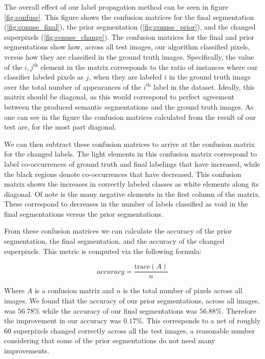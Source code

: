 \documentclass{article} %
\begin{document}
The overall effect of our label propagation method can be seen in figure \ref{fig:confuse}. This figure shows the confusion matrices for the final segmentation (\ref{fig:conuse_final}), the prior segmentation (\ref{fig:conuse_prior}), and the changed superpixels (\ref{fig:conuse_change}). The confusion matrices for the final and prior segmentations show how, across all test images, our algorithm classified pixels, versus how they are classified in the ground truth images. Specifically, the value  of the $i,j^\textrm{th}$ element in the matrix corresponds to the ratio of instances where our classifier labeled pixels as $j$, when they are labeled $i$ in the ground truth image over the total number of appearances of the $i^\textrm{th}$ label in the dataset. Ideally, this matrix should be diagonal, as this would correspond to perfect agreement between the produced semantic segmentations and the ground truth images. As one can see in the figure the confusion matrices calculated from the result of our test are, for the most part diagonal. 

We can then subtract these confusion matrices to arrive at the confusion matrix for the changed labels. The light elements in this confusion matrix correspond to label co-occurrences of ground truth and final labelings that have increased, while the black regions denote co-occurrences that have decreased. This confusion matrix shows the increases in correctly labeled classes as white elements along its diagonal. Of note is the many negative elements in the first column of the matrix. These correspond to decreases in the number of labels classified as void in the final segmentations versus the prior segmentations.

From these confusion matrices we can calculate the accuracy of the prior segmentation, the final segmentation, and the accuracy of the changed superpixels. This metric is computed via the following formula:

\begin{equation}
	accuracy = \frac{\mathrm{trace}(A)}{n}
\end{equation}

Where $A$ is a confusion matrix and $n$ is the total number of pixels across all images. We found that the accuracy of our prior segmentations, across all images, was $56.78\%$ while the accuracy of our final segmentations was $56.88\%$. Therefore the improvement in our accuracy was $0.17\%$. This corresponds to a net of roughly 60 superpixels changed correctly across all the test images, a reasonable number considering that some of the prior segmentations do not need many improvements.
\end{document}
